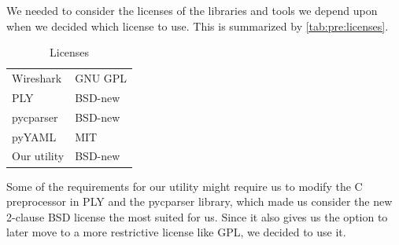 We needed to consider the licenses of the libraries and tools we depend upon
when we decided which license to use. This is summarized by
\autoref{tab:pre:licenses}.
\begin{table}[!h] \small \center
\vspace{-20pt}
\caption{Licenses\label{tab:pre:licenses}}
\begin{tabular}{l l}
	\toprule
	Wireshark & GNU GPL \\
	PLY & BSD-new \\
	pycparser & BSD-new \\
	pyYAML & MIT \\
	\midrule
	Our utility & BSD-new \\
	\bottomrule
\end{tabular}
\vspace{-10pt}
\end{table}

\noindent Some of the requirements for our utility might require us to modify
the C preprocessor in PLY and the pycparser library, which made us consider
the new 2-clause BSD license the most suited for us. Since it also gives us the
option to later move to a more restrictive license like GPL, we decided to use
it.
